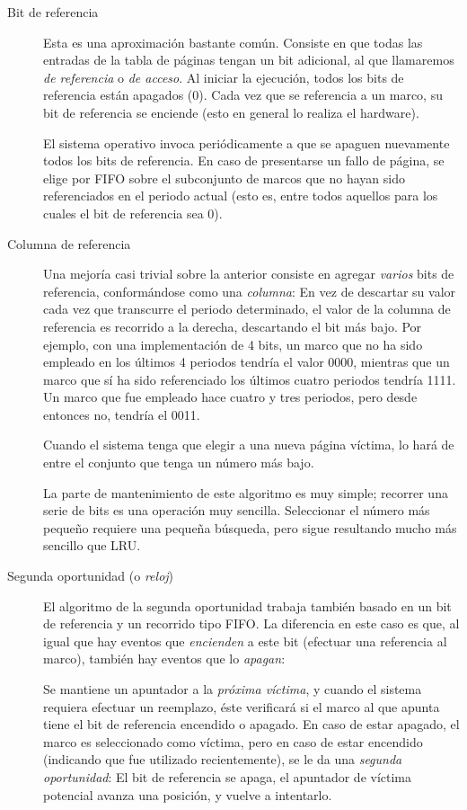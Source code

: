 \documentclass[11pt,fleqn]{book} %
\begin{document}
\begin{description}
\item[Bit de referencia] Esta es una aproximación bastante
     común. Consiste en que todas las entradas de la tabla de páginas
     tengan un bit adicional, al que llamaremos \emph{de referencia} o \emph{de acceso}.
     Al iniciar la ejecución, todos los bits de referencia están apagados
     (0). Cada vez que se referencia a un marco, su bit de referencia
     se enciende (esto en general lo realiza el hardware).

     El sistema operativo invoca periódicamente a que se apaguen
     nuevamente todos los bits de referencia. En caso de presentarse
     un fallo de página, se elige por FIFO sobre el subconjunto de
     marcos que no hayan sido referenciados en el periodo actual (esto
     es, entre todos aquellos para los cuales el bit de referencia sea
     0).
\item[Columna de referencia] Una mejoría casi trivial sobre la anterior
     consiste en agregar \emph{varios} bits de referencia, conformándose
     como una \emph{columna}: En vez de descartar su valor cada vez que
     transcurre el periodo determinado, el valor de la columna de
     referencia es recorrido a la derecha, descartando el bit más
     bajo. Por ejemplo, con una implementación de 4 bits, un
     marco que no ha sido empleado en los últimos 4 periodos tendría
     el valor 0000, mientras que un marco que sí ha sido referenciado
     los últimos cuatro periodos tendría 1111. Un marco que fue
     empleado hace cuatro y tres periodos, pero desde entonces no,
     tendría el 0011.

     Cuando el sistema tenga que elegir a una nueva página víctima,
     lo hará de entre el conjunto que tenga un número más bajo.

     La parte de mantenimiento de este algoritmo es muy simple;
     recorrer una serie de bits es una operación muy
     sencilla. Seleccionar el número más pequeño requiere una pequeña
     búsqueda, pero sigue resultando mucho más sencillo que LRU.
\item[Segunda oportunidad (o \emph{reloj})] El algoritmo de la segunda
     oportunidad trabaja también basado en un bit de referencia y un
     recorrido tipo FIFO. La diferencia en este caso es que, al igual
     que hay eventos que \emph{encienden} a este bit (efectuar una
     referencia al marco), también hay eventos que lo \emph{apagan}:

     Se mantiene un apuntador a la \emph{próxima víctima}, y cuando el
     sistema requiera efectuar un reemplazo, éste verificará si el
     marco al que apunta tiene el bit de referencia encendido o
     apagado. En caso de estar apagado, el marco es seleccionado como
     víctima, pero en caso de estar encendido (indicando que fue
     utilizado recientemente), se le da una \emph{segunda oportunidad}: El
     bit de referencia se apaga, el apuntador de víctima potencial
     avanza una posición, y vuelve a intentarlo.


\end{description}
\end{document}
